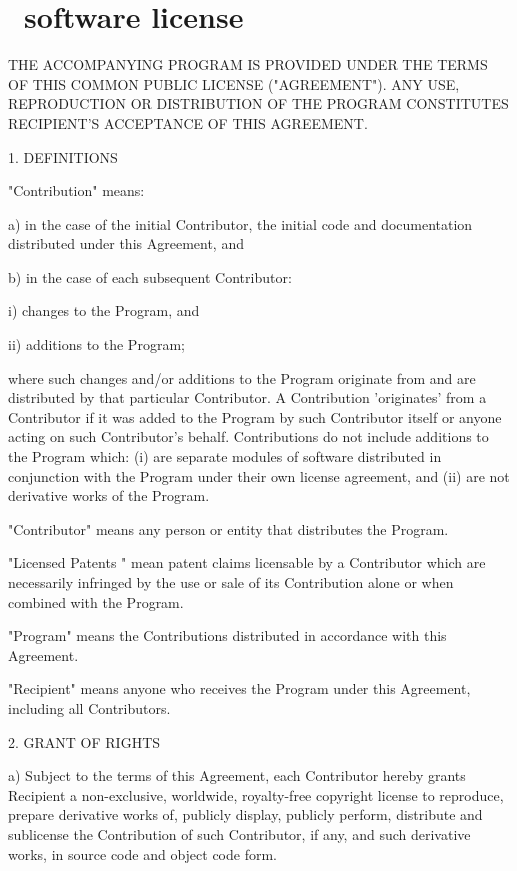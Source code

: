 
\section{\SPMName\ software license\label{sec:Common-Public-License}}
\begin{small}
THE ACCOMPANYING PROGRAM IS PROVIDED UNDER THE TERMS OF THIS COMMON PUBLIC
LICENSE ("AGREEMENT"). ANY USE, REPRODUCTION OR DISTRIBUTION OF THE PROGRAM
CONSTITUTES RECIPIENT'S ACCEPTANCE OF THIS AGREEMENT.

1. DEFINITIONS

"Contribution" means:

a) in the case of the initial Contributor, the initial code and
documentation distributed under this Agreement, and

b) in the case of each subsequent Contributor:

i) changes to the Program, and

ii) additions to the Program;

where such changes and/or additions to the Program originate from and are
distributed by that particular Contributor. A Contribution 'originates' from a
Contributor if it was added to the Program by such Contributor itself or anyone
acting on such Contributor's behalf. Contributions do not include additions to
the Program which: (i) are separate modules of software distributed in
conjunction with the Program under their own license agreement, and (ii) are not
derivative works of the Program.

"Contributor" means any person or entity that distributes the Program.

"Licensed Patents " mean patent claims licensable by a Contributor which are
necessarily infringed by the use or sale of its Contribution alone or when
combined with the Program.

"Program" means the Contributions distributed in accordance with this Agreement.

"Recipient" means anyone who receives the Program under this Agreement,
including all Contributors.


2. GRANT OF RIGHTS

a) Subject to the terms of this Agreement, each Contributor hereby grants
Recipient a non-exclusive, worldwide, royalty-free copyright license to
reproduce, prepare derivative works of, publicly display, publicly perform,
distribute and sublicense the Contribution of such Contributor, if any, and such
derivative works, in source code and object code form.


\end{small}
